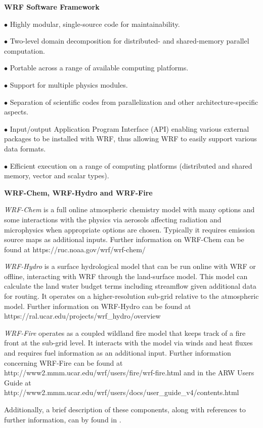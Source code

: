 \vskip 12pt
{\noindent\bf WRF Software Framework}
\vskip 12pt

\begin{description}
\setlength{\itemsep}{-5pt}
\item{$\bullet$} Highly modular, single-source code for maintainability.
%
\item{$\bullet$} Two-level domain decomposition for distributed- and 
shared-memory parallel computation.
%
\item{$\bullet$} Portable across a range of available computing platforms.
%
\item{$\bullet$} Support for multiple physics modules.
%
\item{$\bullet$}
Separation of scientific codes from parallelization and other 
architecture-specific aspects.
%
\item{$\bullet$}
Input/output Application Program Interface (API) enabling various external
packages to be installed with WRF, thus allowing WRF
to easily support various data formats.
%
\item{$\bullet$}
Efficient execution on a range of computing platforms
(distributed and shared memory, vector
and scalar types).
%
%
\end{description}

\vskip 12pt
{\noindent\bf WRF-Chem, WRF-Hydro and WRF-Fire}
\vskip 12pt

{\em WRF-Chem} is a full online atmospheric chemistry model with many options and some
interactions with the physics via aerosols affecting radiation and microphysics when appropriate
options are chosen. Typically it requires emission source maps as additional inputs.  Further information on WRF-Chem can be found at
https://ruc.noaa.gov/wrf/wrf-chem/

{\em WRF-Hydro} is a surface hydrological model that can be run online with WRF or offline,
interacting with WRF through the land-surface model. This model can calculate the land water
budget terms including streamflow given additional data for routing. It operates on a higher-resolution
sub-grid relative to the atmospheric model.  Further information on WRF-Hydro can be found at
https://ral.ucar.edu/projects/wrf\_hydro/overview

{\em WRF-Fire} operates as a coupled wildland fire model that keeps track of a fire front at the
sub-grid level. It interacts with the model via winds and heat fluxes and requires fuel information as
an additional input.  Further information concerning WRF-Fire can be found at 
http://www2.mmm.ucar.edu/wrf/users/fire/wrf-fire.html
and in the ARW Users Guide at
http://www2.mmm.ucar.edu/wrf/users/docs/user\_guide\_v4/contents.html



Additionally, a brief description of these components, along with references to further information, can by found in \citet{powers17}.